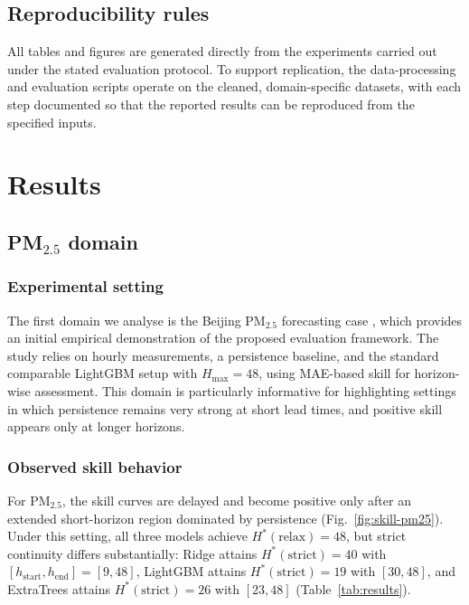 \documentclass[pdflatex,sn-mathphys]{sn-jnl}
\begin{document}
\subsection{Reproducibility rules}
All tables and figures are generated directly from the experiments
carried out under the stated evaluation protocol. To support
replication, the data-processing and evaluation scripts operate on the
cleaned, domain-specific datasets, with each step documented so that
the reported results can be reproduced from the specified inputs.

\section{Results}\label{sec:results}

\subsection{\texorpdfstring{PM$_{2.5}$}{PM2.5} domain}\label{sec:pm25}

\subsubsection{Experimental setting}
The first domain we analyse is the Beijing PM$_{2.5}$ forecasting case \citep{chen2015beijingpm25}, which provides an initial empirical demonstration of the proposed evaluation framework. The study relies on hourly measurements, a persistence baseline, and the standard comparable LightGBM setup with $H_{\max}=48$, using MAE-based skill for horizon-wise assessment. This domain is particularly informative for highlighting settings in which persistence remains very strong at short lead times, and positive skill appears only at longer horizons.

\subsubsection{Observed skill behavior}
For PM$_{2.5}$, the skill curves are delayed and become positive only after an extended short-horizon region dominated by persistence (Fig.~\ref{fig:skill-pm25}). Under this setting, all three models achieve $H^*(\mathrm{relax})=48$, but strict continuity differs substantially: Ridge attains $H^*(\mathrm{strict})=40$ with $[h_{\mathrm{start}},h_{\mathrm{end}}]=[9,48]$, LightGBM attains $H^*(\mathrm{strict})=19$ with $[30,48]$, and ExtraTrees attains $H^*(\mathrm{strict})=26$ with $[23,48]$ (Table~\ref{tab:results}).
\end{document}
